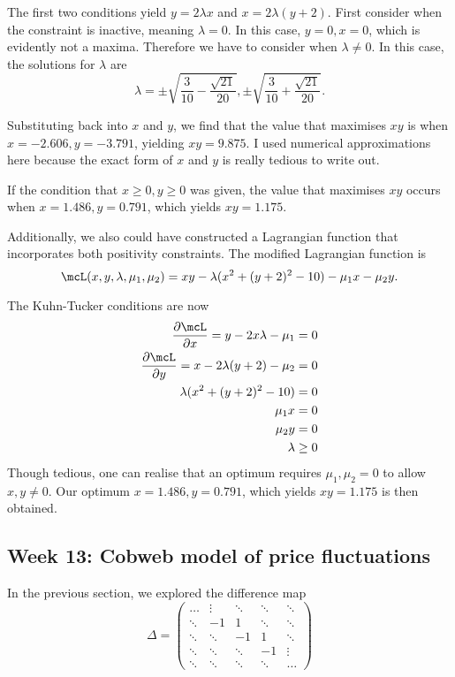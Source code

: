 \documentclass[a4paper, 12pt,oneside,openany]{book}
\begin{document}
The first two conditions yield $y=2\lambda x$ and $x=2\lambda(y+2)$. First consider when the constraint is inactive, meaning $\lambda=0$. In this case, $y=0, x=0$, which is evidently not a maxima. Therefore we have to consider when $\lambda \neq 0$. In this case, the solutions for $\lambda$ are $$\lambda = \pm \sqrt{\frac{3}{10}-\frac{\sqrt{21}}{20}}, \pm \sqrt{\frac{3}{10}+\frac{\sqrt{21}}{20}}.$$

Substituting back into $x$ and $y$, we find that the value that maximises $xy$ is when $x=-2.606, y=-3.791$, yielding $xy=9.875$. I used numerical approximations here because the exact form of $x$ and $y$ is really tedious to write out.

If the condition that $x\geq0, y\geq0$ was given, the value that maximises $xy$ occurs when $x=1.486, y=0.791$, which yields $xy=1.175$. 

Additionally, we also could have constructed a Lagrangian function that incorporates both positivity constraints. The modified Lagrangian function is $$\mcL(x, y, \lambda, \mu_1, \mu_2) = xy - \lambda(x^2+(y+2)^2-10) - \mu_1 x - \mu_2y.$$

The Kuhn-Tucker conditions are now \begin{align*} \frac{\partial \mcL}{\partial x} = y -2x\lambda-\mu_1&=0 \\ \frac{\partial \mcL}{\partial y} = x-2\lambda(y+2)-\mu_2&=0 \\ \lambda (x^2+(y+2)^2-10)&=0 \\ \mu_1x&=0 \\ \mu_2y&=0 \\ \lambda &\geq0 \end{align*} Though tedious, one can realise that an optimum requires $\mu_1, \mu_2=0$ to allow $x, y\neq 0$. Our optimum $x=1.486, y=0.791$, which yields $xy=1.175$ is then obtained.

\subsection{Week 13: Cobweb model of price fluctuations}

In the previous section, we explored the difference map $$\Delta=\begin{pmatrix} \hdots & \vdots & \ddots & \ddots & \ddots \\ \ddots & -1 & 1 & \ddots & \ddots \\ \ddots & \ddots & -1 & 1 & \ddots \\ \ddots & \ddots & \ddots & -1 & \vdots \\ \ddots&\ddots&\ddots&\ddots&\hdots \end{pmatrix}$$
\end{document}
